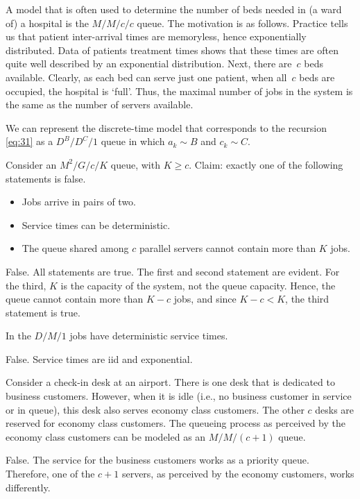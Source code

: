 \documentclass[stochastic-or.tex]{subfiles}
\begin{document}
A model that is often used to determine the number of beds needed in (a ward of) a hospital is the $M/M/c/c$ queue.
The motivation is as follows.
Practice tells us that patient inter-arrival times are memoryless, hence exponentially distributed.
Data of patients treatment times shows that these times are often quite well described by an exponential distribution.
Next, there are~$c$ beds available.
Clearly, as each bed can serve just one patient, when all~$c$ beds are occupied, the hospital is `full'.
Thus, the maximal number of jobs in the system is the same as the number of servers available.

We can represent the discrete-time model  that corresponds to the recursion \cref{eq:31} as a $D^{B}/D^{C}/1$ queue in which $a_{k}\sim B$ and $c_{k}\sim C$.


\begin{truefalse}
Consider an $M^2/G/c/K$ queue, with $K\geq c$.
Claim: exactly one of the following statements is false.
\begin{itemize}
        \item Jobs arrive in pairs of two.
        \item Service times can be deterministic.
        \item The  queue shared among $c$ parallel servers cannot contain more than $K$ jobs.
\end{itemize}
\begin{solution}
    False.
All statements are true.
The first and second statement are evident.
For the third, $K$ is the capacity of the system, not the queue capacity.
Hence, the queue cannot contain more than $K-c$ jobs, and since $K-c < K$, the third statement is true.
\end{solution}
\end{truefalse}

\begin{truefalse}
In the $D/M/1$ jobs have deterministic service times.
\begin{solution}
False. Service times are iid and exponential.
\end{solution}
\end{truefalse}

\begin{truefalse}
Consider a check-in desk at an airport.
There is one desk that is dedicated to business customers.
However, when it is idle (i.e., no business customer in service or in queue), this desk also serves economy class customers.
The other $c$ desks are reserved for economy class customers.
The queueing process as perceived by the economy class customers can be modeled as an $M/M/(c+1)$ queue.
\begin{solution}
False. The service  for the business customers works as a priority queue. Therefore, one of the $c+1$ servers, as perceived by the economy customers, works differently.
\end{solution}
\end{truefalse}



\end{document}
